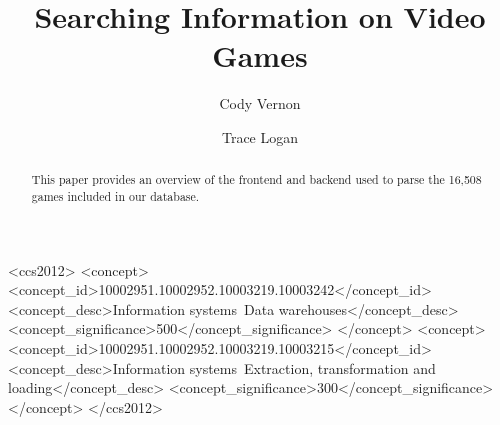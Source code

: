 \documentclass[sigconf]{acmart}
\begin{document}
\title{Searching Information on Video Games}
\subtitle{}

\author{Cody Vernon}

\author{Trace Logan}


\begin{abstract}
This paper provides an overview of the frontend and backend used to parse the 16,508 games included in our database.
\end{abstract}

%
%
\begin{CCSXML}
<ccs2012>
<concept>
<concept_id>10002951.10002952.10003219.10003242</concept_id>
<concept_desc>Information systems~Data warehouses</concept_desc>
<concept_significance>500</concept_significance>
</concept>
<concept>
<concept_id>10002951.10002952.10003219.10003215</concept_id>
<concept_desc>Information systems~Extraction, transformation and loading</concept_desc>
<concept_significance>300</concept_significance>
</concept>
</ccs2012>
\end{CCSXML}





\maketitle





\end{document}
